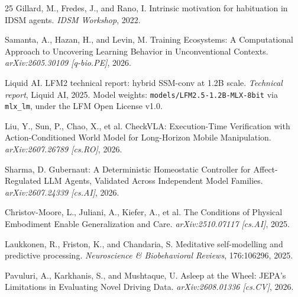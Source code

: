 \documentclass[11pt,a4paper]{article}
\begin{document}
\begin{thebibliography}{25}
 Gillard, M., Fredes, J., and Rano, I. Intrinsic motivation for habituation in IDSM agents. \textit{IDSM Workshop}, 2022.

 Samanta, A., Hazan, H., and Levin, M. Training Ecosystems: A Computational Approach to Uncovering Learning Behavior in Unconventional Contexts. \textit{arXiv:2605.30109 [q-bio.PE]}, 2026.

 Liquid AI. LFM2 technical report: hybrid SSM-conv at 1.2B scale. \textit{Technical report}, Liquid AI, 2025. Model weights: \texttt{models/LFM2.5-1.2B-MLX-8bit} via \texttt{mlx\_lm}, under the LFM Open License v1.0.

 Liu, Y., Sun, P., Chao, X., et al. CheckVLA: Execution-Time Verification with Action-Conditioned World Model for Long-Horizon Mobile Manipulation. \textit{arXiv:2607.26789 [cs.RO]}, 2026.

 Sharma, D. Gubernaut: A Deterministic Homeostatic Controller for Affect-Regulated LLM Agents, Validated Across Independent Model Families. \textit{arXiv:2607.24339 [cs.AI]}, 2026.

 Christov-Moore, L., Juliani, A., Kiefer, A., et al. The Conditions of Physical Embodiment Enable Generalization and Care. \textit{arXiv:2510.07117 [cs.AI]}, 2025.

 Laukkonen, R., Friston, K., and Chandaria, S. Meditative self-modelling and predictive processing. \textit{Neuroscience \& Biobehavioral Reviews}, 176:106296, 2025.

 Pavuluri, A., Karkhanis, S., and Mushtaque, U. Asleep at the Wheel: JEPA's Limitations in Evaluating Novel Driving Data. \textit{arXiv:2608.01336 [cs.CV]}, 2026.

\end{thebibliography}
\end{document}

